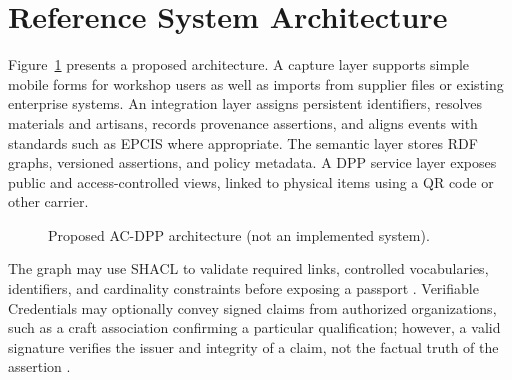 \documentclass[conference]{IEEEtran}
\begin{document}
\section{Reference System Architecture}
Figure~\ref{fig:architecture} presents a proposed architecture. A capture layer supports simple mobile forms for workshop users as well as imports from supplier files or existing enterprise systems. An integration layer assigns persistent identifiers, resolves materials and artisans, records provenance assertions, and aligns events with standards such as EPCIS where appropriate. The semantic layer stores RDF graphs, versioned assertions, and policy metadata. A DPP service layer exposes public and access-controlled views, linked to physical items using a QR code or other carrier.

\begin{figure}[t]
\centering
{}
\caption{Proposed AC-DPP architecture (not an implemented system).}
\label{fig:architecture}
\end{figure}

The graph may use SHACL to validate required links, controlled vocabularies, identifiers, and cardinality constraints before exposing a passport \cite{w3c2017shacl}. Verifiable Credentials may optionally convey signed claims from authorized organizations, such as a craft association confirming a particular qualification; however, a valid signature verifies the issuer and integrity of a claim, not the factual truth of the assertion \cite{w3c2025vc}.
\end{document}
